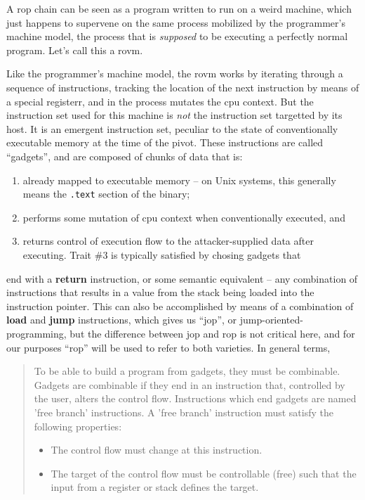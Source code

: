 \documentclass[12pt,glossary]{dalthesis}
\begin{document}
A \gls{rop} chain can be seen as a program written to run on a weird machine, which just
happens to supervene on the same process mobilized by the programmer's machine
model, the process that is \emph{supposed} to be executing a perfectly normal
program. Let's call this a \gls{rovm}.

Like the programmer's machine model, the \gls{rovm} works by iterating through a
sequence of instructions, tracking the location of the next instruction by means
of a special registerr, and in the process mutates the \gls{cpu} context. But the
instruction set used for this machine is \emph{not} the instruction set targetted by
its host. It is an emergent instruction set, peculiar to the state of
conventionally executable memory at the time of the pivot. These instructions
are called ``gadgets'', and are composed of chunks of data that is:
\begin{enumerate}
\item already mapped to executable memory -- on Unix systems, this
generally means the \texttt{.text} section of the binary;
\item performs some mutation of \gls{cpu} context when conventionally
executed, and
\item returns control of execution flow to the attacker-supplied data
after executing. Trait \#3 is typically satisfied by chosing gadgets that
\end{enumerate}
end with a \textbf{return} instruction, or some semantic equivalent -- any combination
of instructions that results in a value from the stack being loaded into the
instruction pointer. This can also be accomplished by means of a combination of
\textbf{load} and \textbf{jump} instructions, which gives us ``\gls{jop}'', or
jump-oriented-programming, but the difference between \gls{jop} and \gls{rop} is not
critical here, and for our purposes ``\gls{rop}'' will be used to refer to both
varieties. In general terms, 

\begin{quote}
To be able to build a program from gadgets, they must be combinable. Gadgets
are combinable if they end in an instruction that, controlled by the user, 
alters the control flow. Instructions which end gadgets are named 'free branch'
instructions. A 'free branch' instruction must satisfy the following properties:

\begin{itemize}
\item The control flow must change at this instruction.

\item The target of the control flow must be controllable (free) such that the
input from a register or stack defines the target. \cite{kornau09}
\end{itemize}
\end{quote}
\end{document}
